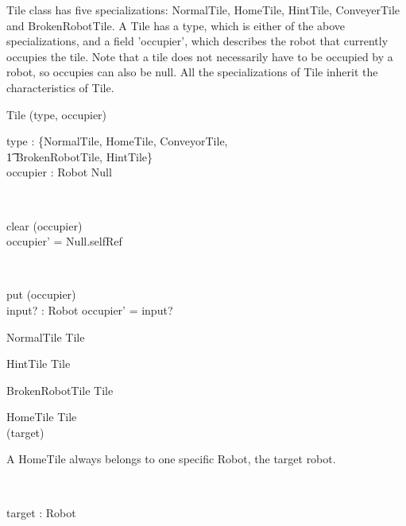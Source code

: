\documentclass[12pt]{article}
\begin{document}
Tile class has five specializations: NormalTile, HomeTile, HintTile, ConveyerTile and BrokenRobotTile. A Tile has a type, which is either of the above specializations, and a field 'occupier', which describes the robot that currently occupies the tile. Note that a tile does not necessarily have to be occupied by a robot, so occupies can also be null. All the specializations of Tile inherit the characteristics of Tile.
\begin{class}{Tile}
\upharpoonright (type, occupier) \\
\begin{state}
type : \{NormalTile, HomeTile, ConveyorTile, \\ \t1 BrokenRobotTile, HintTile\} \\
occupier : Robot \cup Null
\end{state} \\
\begin{schema}{clear}
\Delta (occupier) \\
\where
occupier' = Null.selfRef
\end{schema} \\
\begin{schema}{put}
\Delta (occupier) \\
input? : Robot
\where
occupier' = input?
\end{schema}
\end{class}

\begin{class}{NormalTile}
Tile
\end{class}

\begin{class}{HintTile}
Tile
\end{class}

\begin{class}{BrokenRobotTile}
Tile
\end{class}

\begin{class}{HomeTile}
Tile \\
\upharpoonright (target) \\
\begin{classcom}
A HomeTile always belongs to one specific Robot, the target robot.
\end{classcom} \\
\begin{state}
target : Robot
\end{state} \\
\end{class}
\end{document}
